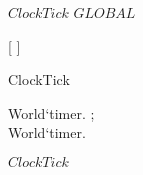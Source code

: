 \kClass $ClockTick$ \kISO $GLOBAL$
\par
\kInstanceVarDef
\parlinebr
\begin{insvar}
[{ }]
\end{insvar}
\par
\kOperations
{}\begin{op}[e]{ClockTick}%
\signature{Time \Oto ClockTick}
\end{op}
\kThreadDef
\begin{thread}
\begin{while}{\True }
\begin{blockstmt}
World`timer. ; \\
World`timer.
\end{blockstmt}
\end{while}
\end{thread}
\kEnd $ClockTick$

